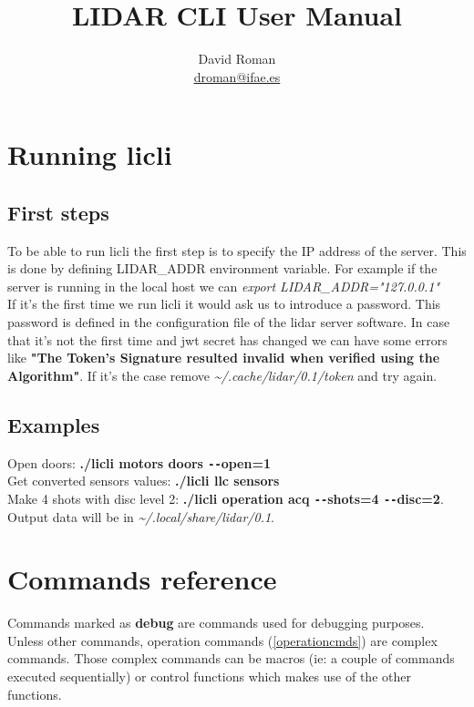 \documentclass[letterpaper, 10 pt]{article}
\begin{document}
\title{LIDAR CLI User Manual}
\author{David Roman \\  \href{mailto:droman@ifae.es}{droman@ifae.es} }
\maketitle
\pagestyle{empty}
\newpage
\tableofcontents
\newpage
{}
\pagestyle{plain}

\section{Running licli}
\subsection{First steps}
To be able to run licli the first step is to specify the IP address of the server. This is done by defining LIDAR\_ADDR environment variable. For example if the server is running in the local host we can \emph{export LIDAR\_ADDR="127.0.0.1"}\\
\linebreak
If it's the first time we run licli it would ask us to introduce a password. This password is defined in the configuration file of the lidar server software. 
In case that it's not the first time and jwt secret has changed we can have some errors like \textbf{"The Token's Signature resulted invalid when verified using the Algorithm"}. If it's the case remove \textit{\~{}/.cache/lidar/0.1/token} and try again.\\

\subsection{Examples}

Open doors: \textbf{./licli motors doors \texttt{-{}-}open=1}\\
Get converted sensors values: \textbf{./licli llc sensors}\\
Make 4 shots with disc level 2: \textbf{./licli operation acq \texttt{-{}-}shots=4 \texttt{-{}-}disc=2}. Output data will be in \textit{\~{}/.local/share/lidar/0.1}.

\section{Commands reference}
Commands marked as \textbf{debug} are commands used for debugging purposes.\\
\linebreak
Unless other commands, operation commands (\ref{operationcmds}) are complex commands. Those complex commands can be macros (ie: a couple of commands executed sequentially) or control functions which makes use of the other functions.
\end{document}
